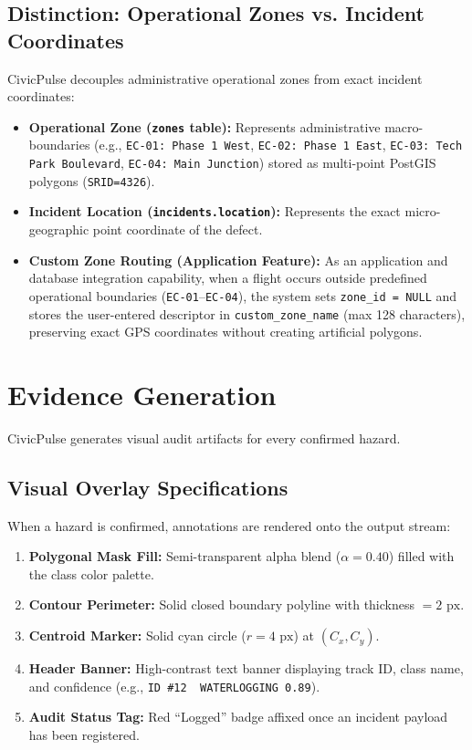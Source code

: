\documentclass[11pt,a4paper]{article}
\begin{document}
\subsection{Distinction: Operational Zones vs. Incident Coordinates}
CivicPulse decouples administrative operational zones from exact incident coordinates:
\begin{itemize}[leftmargin=*]
    \item \textbf{Operational Zone (\texttt{zones} table):} Represents administrative macro-boundaries (e.g., \texttt{EC-01: Phase 1 West}, \texttt{EC-02: Phase 1 East}, \texttt{EC-03: Tech Park Boulevard}, \texttt{EC-04: Main Junction}) stored as multi-point PostGIS polygons (\texttt{SRID=4326}).
    \item \textbf{Incident Location (\texttt{incidents.location}):} Represents the exact micro-geographic point coordinate of the defect.
    \item \textbf{Custom Zone Routing (Application Feature):} As an application and database integration capability, when a flight occurs outside predefined operational boundaries (\texttt{EC-01}--\texttt{EC-04}), the system sets \texttt{zone\_id = NULL} and stores the user-entered descriptor in \texttt{custom\_zone\_name} (max 128 characters), preserving exact GPS coordinates without creating artificial polygons.
\end{itemize}

\section{Evidence Generation}
CivicPulse generates visual audit artifacts for every confirmed hazard.

\subsection{Visual Overlay Specifications}
When a hazard is confirmed, annotations are rendered onto the output stream:
\begin{enumerate}[leftmargin=*]
    \item \textbf{Polygonal Mask Fill:} Semi-transparent alpha blend ($\alpha = 0.40$) filled with the class color palette.
    \item \textbf{Contour Perimeter:} Solid closed boundary polyline with thickness $= 2\text{ px}$.
    \item \textbf{Centroid Marker:} Solid cyan circle ($r = 4\text{ px}$) at $(C_x, C_y)$.
    \item \textbf{Header Banner:} High-contrast text banner displaying track ID, class name, and confidence (e.g., \texttt{ID \#12 \textbar\ WATERLOGGING 0.89}).
    \item \textbf{Audit Status Tag:} Red ``Logged'' badge affixed once an incident payload has been registered.
\end{enumerate}
\end{document}
